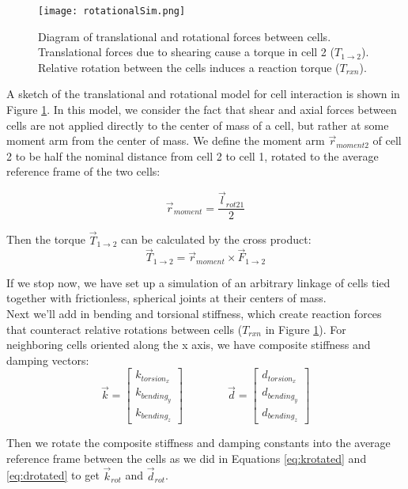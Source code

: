 {\begin{figure}
  \texttt{[image: rotationalSim.png]}
  \caption{Diagram of translational and rotational forces between cells.  Translational forces due to shearing cause a torque in cell 2 ($T_{1\rightarrow2}$).  Relative rotation between the cells induces a reaction torque ($T_{rxn}$).}
  \label{fig:rotationalSim}
\end{figure}

A sketch of the translational and rotational model for cell interaction is shown in Figure \ref{fig:rotationalSim}.  In this model, we consider the fact that shear and axial forces between cells are not applied directly to the center of mass of a cell, but rather at some moment arm from the center of mass.  We define the moment arm $\vec{r}_{moment2}$ of cell 2 to be half the nominal distance from cell 2 to cell 1, rotated to the average reference frame of the two cells:

\[ \vec{r}_{moment} = \dfrac{\vec{l}_{rot21}}{2}\]

Then the torque $\vec{T}_{1\rightarrow2}$ can be calculated by the cross product:
\begin{equation}\label{eq:moment1to2}
\vec{T}_{1\rightarrow2} =  \vec{r}_{moment} \times \vec{F}_{1\rightarrow2}
\end{equation}

If we stop now, we have set up a simulation of an arbitrary linkage of cells tied together with frictionless, spherical joints at their centers of mass.\\

Next we'll add in bending and torsional stiffness, which create reaction forces that counteract relative rotations between cells ($T_{rxn}$ in Figure \ref{fig:rotationalSim}).  For neighboring cells oriented along the x axis, we have composite stiffness and damping vectors:
\[ \vec{k} =  \left[ \begin{array}{ccc}
k_{torsion_x}\\
k_{bending_{y}}\\
k_{bending_{z}}
 \end{array} \right]  
  \qquad\qquad
  \vec{d} =  \left[ \begin{array}{ccc}
d_{torsion_x}\\
d_{bending_{y}}\\
d_{bending_{z}}
 \end{array} \right] \] 

Then we rotate the composite stiffness and damping constants into the average reference frame between the cells as we did in Equations \ref{eq:krotated} and \ref{eq:drotated} to get $\vec{k}_{rot}$ and $\vec{d}_{rot}$.\\

}
